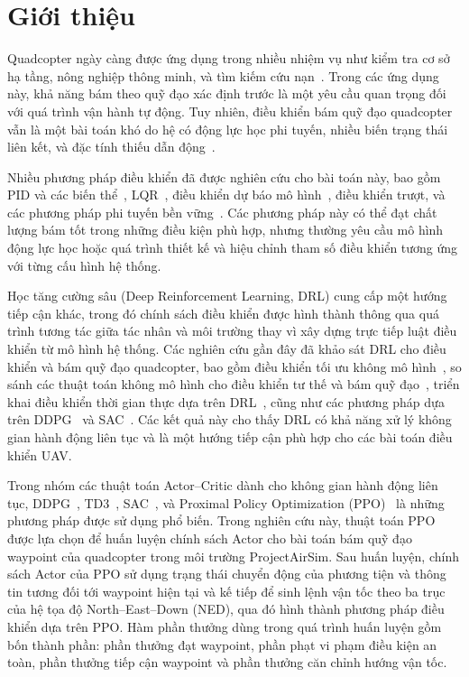 \section{Giới thiệu}
\label{sec:introduction}

Quadcopter ngày càng được ứng dụng trong nhiều nhiệm vụ như kiểm tra cơ sở hạ tầng, nông nghiệp thông minh, và tìm kiếm cứu nạn~\cite{b1,b2,b3}. Trong các ứng dụng này, khả năng bám theo quỹ đạo xác định trước là một yêu cầu quan trọng đối với quá trình vận hành tự động. Tuy nhiên, điều khiển bám quỹ đạo quadcopter vẫn là một bài toán khó do hệ có động lực học phi tuyến, nhiều biến trạng thái liên kết, và đặc tính thiếu dẫn động~\cite{b4,b5}.

Nhiều phương pháp điều khiển đã được nghiên cứu cho bài toán này, bao gồm PID và các biến thể~\cite{b6}, LQR~\cite{b7}, điều khiển dự báo mô hình~\cite{b8}, điều khiển trượt, và các phương pháp phi tuyến bền vững~\cite{b9,b10}. Các phương pháp này có thể đạt chất lượng bám tốt trong những điều kiện phù hợp, nhưng thường yêu cầu mô hình động lực học hoặc quá trình thiết kế và hiệu chỉnh tham số điều khiển tương ứng với từng cấu hình hệ thống.

Học tăng cường sâu (Deep Reinforcement Learning, DRL) cung cấp một hướng tiếp cận khác, trong đó chính sách điều khiển được hình thành thông qua quá trình tương tác giữa tác nhân và môi trường thay vì xây dựng trực tiếp luật điều khiển từ mô hình hệ thống. Các nghiên cứu gần đây đã khảo sát DRL cho điều khiển và bám quỹ đạo quadcopter, bao gồm điều khiển tối ưu không mô hình~\cite{b11}, so sánh các thuật toán không mô hình cho điều khiển tư thế và bám quỹ đạo~\cite{b12}, triển khai điều khiển thời gian thực dựa trên DRL~\cite{b13}, cũng như các phương pháp dựa trên DDPG~\cite{b14,b15} và SAC~\cite{b16}. Các kết quả này cho thấy DRL có khả năng xử lý không gian hành động liên tục và là một hướng tiếp cận phù hợp cho các bài toán điều khiển UAV.

Trong nhóm các thuật toán Actor--Critic dành cho không gian hành động liên tục, DDPG~\cite{b17}, TD3~\cite{b18}, SAC~\cite{b19}, và Proximal Policy Optimization (PPO)~\cite{b20} là những phương pháp được sử dụng phổ biến. Trong nghiên cứu này, thuật toán PPO được lựa chọn để huấn luyện chính sách Actor cho bài toán bám quỹ đạo waypoint của quadcopter trong môi trường ProjectAirSim. Sau huấn luyện, chính sách Actor của PPO sử dụng trạng thái chuyển động của phương tiện và thông tin tương đối tới waypoint hiện tại và kế tiếp để sinh lệnh vận tốc theo ba trục của hệ tọa độ North--East--Down (NED), qua đó hình thành phương pháp điều khiển dựa trên PPO. Hàm phần thưởng dùng trong quá trình huấn luyện gồm bốn thành phần: phần thưởng đạt waypoint, phần phạt vi phạm điều kiện an toàn, phần thưởng tiếp cận waypoint và phần thưởng căn chỉnh hướng vận tốc.

